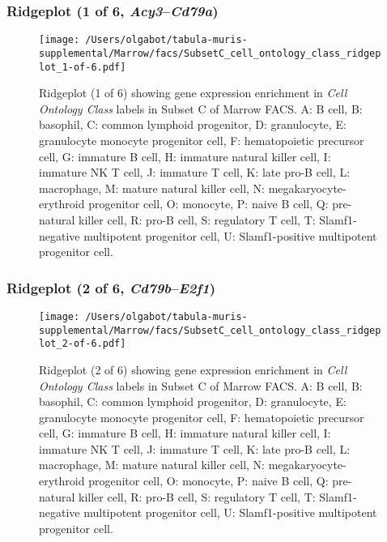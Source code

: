 \clearpage

\subsubsection{Ridgeplot (1 of 6, \emph{Acy3}--\emph{Cd79a})}
\begin{figure}[h]
\centering
\texttt{[image: /Users/olgabot/tabula-muris-supplemental/Marrow/facs/SubsetC\_cell\_ontology\_class\_ridgeplot\_1-of-6.pdf]}

\caption{ Ridgeplot (1 of 6)  showing gene expression enrichment in \emph{Cell Ontology Class} labels in Subset C of Marrow FACS. A: B cell, B: basophil, C: common lymphoid progenitor, D: granulocyte, E: granulocyte monocyte progenitor cell, F: hematopoietic precursor cell, G: immature B cell, H: immature natural killer cell, I: immature NK T cell, J: immature T cell, K: late pro-B cell, L: macrophage, M: mature natural killer cell, N: megakaryocyte-erythroid progenitor cell, O: monocyte, P: naive B cell, Q: pre-natural killer cell, R: pro-B cell, S: regulatory T cell, T: Slamf1-negative multipotent progenitor cell, U: Slamf1-positive multipotent progenitor cell.}
\end{figure}


\clearpage

\subsubsection{Ridgeplot (2 of 6, \emph{Cd79b}--\emph{E2f1})}
\begin{figure}[h]
\centering
\texttt{[image: /Users/olgabot/tabula-muris-supplemental/Marrow/facs/SubsetC\_cell\_ontology\_class\_ridgeplot\_2-of-6.pdf]}

\caption{ Ridgeplot (2 of 6)  showing gene expression enrichment in \emph{Cell Ontology Class} labels in Subset C of Marrow FACS. A: B cell, B: basophil, C: common lymphoid progenitor, D: granulocyte, E: granulocyte monocyte progenitor cell, F: hematopoietic precursor cell, G: immature B cell, H: immature natural killer cell, I: immature NK T cell, J: immature T cell, K: late pro-B cell, L: macrophage, M: mature natural killer cell, N: megakaryocyte-erythroid progenitor cell, O: monocyte, P: naive B cell, Q: pre-natural killer cell, R: pro-B cell, S: regulatory T cell, T: Slamf1-negative multipotent progenitor cell, U: Slamf1-positive multipotent progenitor cell.}
\end{figure}


\clearpage

